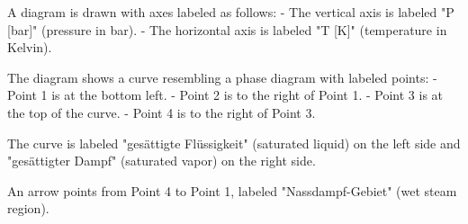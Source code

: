 A diagram is drawn with axes labeled as follows:  
- The vertical axis is labeled "P [bar]" (pressure in bar).  
- The horizontal axis is labeled "T [K]" (temperature in Kelvin).  

The diagram shows a curve resembling a phase diagram with labeled points:  
- Point 1 is at the bottom left.  
- Point 2 is to the right of Point 1.  
- Point 3 is at the top of the curve.  
- Point 4 is to the right of Point 3.  

The curve is labeled "gesättigte Flüssigkeit" (saturated liquid) on the left side and "gesättigter Dampf" (saturated vapor) on the right side.  

An arrow points from Point 4 to Point 1, labeled "Nassdampf-Gebiet" (wet steam region).